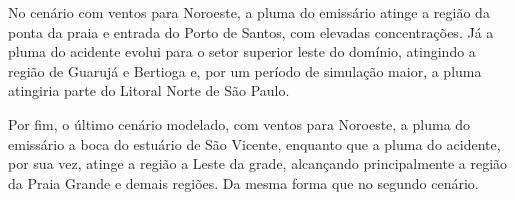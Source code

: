 \documentclass[11pt]{article}
\begin{document}
No cenário com ventos para Noroeste, a pluma do emissário atinge a
região da ponta da praia e entrada do Porto de Santos, com elevadas
concentrações. Já a pluma do acidente evolui para o setor superior leste
do domínio, atingindo a região de Guarujá e Bertioga e, por um período
de simulação maior, a pluma atingiria parte do Litoral Norte de São
Paulo.

Por fim, o último cenário modelado, com ventos para Noroeste, a pluma do
emissário a boca do estuário de São Vicente, enquanto que a pluma do
acidente, por sua vez, atinge a região a Leste da grade, alcançando
principalmente a região da Praia Grande e demais regiões. Da mesma forma
que no segundo cenário.


\end{document}
